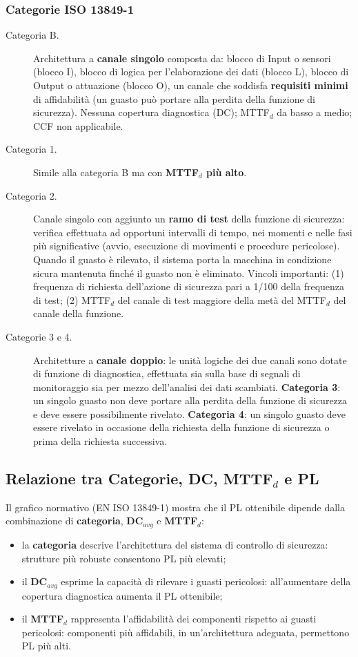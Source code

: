 \subsubsection{Categorie ISO 13849-1}
\begin{description}
    \item[Categoria B.] Architettura a \textbf{canale singolo} composta da: blocco di Input o sensori (blocco I), blocco di logica per l'elaborazione dei dati (blocco L), blocco di Output o attuazione (blocco O), un canale che soddisfa \textbf{requisiti minimi} di affidabilità (un guasto può portare alla perdita della funzione di sicurezza). Nessuna copertura diagnostica (DC); MTTF$_d$ da basso a medio; CCF non applicabile.
    \item[Categoria 1.] Simile alla categoria B ma con \textbf{MTTF$_d$ più alto}.
    \item[Categoria 2.] Canale singolo con aggiunto un \textbf{ramo di test} della funzione di sicurezza: verifica effettuata ad opportuni intervalli di tempo, nei momenti e nelle fasi più significative (avvio, esecuzione di movimenti e procedure pericolose). Quando il guasto è rilevato, il sistema porta la macchina in condizione sicura mantenuta finché il guasto non è eliminato. Vincoli importanti: (1) frequenza di richiesta dell'azione di sicurezza pari a 1/100 della frequenza di test; (2) MTTF$_d$ del canale di test maggiore della metà del MTTF$_d$ del canale della funzione.
    \item[Categorie 3 e 4.] Architetture a \textbf{canale doppio}: le unità logiche dei due canali sono dotate di funzione di diagnostica, effettuata sia sulla base di segnali di monitoraggio sia per mezzo dell'analisi dei dati scambiati. \textbf{Categoria 3}: un singolo guasto non deve portare alla perdita della funzione di sicurezza e deve essere possibilmente rivelato. \textbf{Categoria 4}: un singolo guasto deve essere rivelato in occasione della richiesta della funzione di sicurezza o prima della richiesta successiva.
\end{description}

\subsection{Relazione tra Categorie, DC, MTTF$_d$ e PL}
Il grafico normativo (EN ISO 13849-1) mostra che il PL ottenibile dipende dalla combinazione di \textbf{categoria}, \textbf{DC$_{avg}$} e \textbf{MTTF$_d$}:
\begin{itemize}
    \item la \textbf{categoria} descrive l'architettura del sistema di controllo di sicurezza: strutture più robuste consentono PL più elevati;
    \item il \textbf{DC$_{avg}$} esprime la capacità di rilevare i guasti pericolosi: all'aumentare della copertura diagnostica aumenta il PL ottenibile;
    \item il \textbf{MTTF$_d$} rappresenta l'affidabilità dei componenti rispetto ai guasti pericolosi: componenti più affidabili, in un'architettura adeguata, permettono PL più alti.
\end{itemize}

